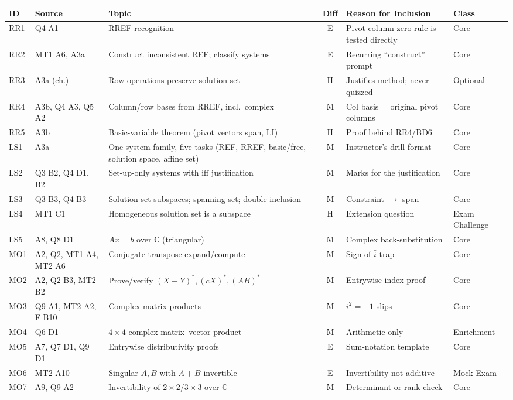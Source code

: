 \documentclass[9pt]{article}
\begin{document}
{\footnotesize\begin{longtable}{@{}l p{2.6cm} p{5.2cm} c p{3.9cm} p{1.7cm}@{}}\toprule \textbf{ID}&\textbf{Source}&\textbf{Topic}&\textbf{Diff}&\textbf{Reason for Inclusion}&\textbf{Class}\\\midrule\endhead
RR1 & Q4 A1 & RREF recognition & E & Pivot-column zero rule is tested directly & Core\\
RR2 & MT1 A6, A3a & Construct inconsistent REF; classify systems & E & Recurring ``construct'' prompt & Core\\
RR3 & A3a (ch.) & Row operations preserve solution set & H & Justifies method; never quizzed & Optional\\
RR4 & A3b, Q4 A3, Q5 A2 & Column/row bases from RREF, incl.\ complex & M & Col basis = original pivot columns & Core\\
RR5 & A3b & Basic-variable theorem (pivot vectors span, LI) & H & Proof behind RR4/BD6 & Core\\
LS1 & A3a & One system family, five tasks (REF, RREF, basic/free, solution space, affine set) & M & Instructor's drill format & Core\\
LS2 & Q3 B2, Q4 D1, B2 & Set-up-only systems with iff justification & M & Marks for the justification & Core\\
LS3 & Q3 B3, Q4 B3 & Solution-set subspaces; spanning set; double inclusion & M & Constraint $\to$ span & Core\\
LS4 & MT1 C1 & Homogeneous solution set is a subspace & H & Extension question & Exam Challenge\\
LS5 & A8, Q8 D1 & $Ax=b$ over $\mathbb C$ (triangular) & M & Complex back-substitution & Core\\
MO1 & A2, Q2, MT1 A4, MT2 A6 & Conjugate-transpose expand/compute & M & Sign of $\bar i$ trap & Core\\
MO2 & A2, Q2 B3, MT2 B2 & Prove/verify $(X{+}Y)^*,(cX)^*,(AB)^*$ & M & Entrywise index proof & Core\\
MO3 & Q9 A1, MT2 A2, F B10 & Complex matrix products & M & $i^2=-1$ slips & Core\\
MO4 & Q6 D1 & $4\times4$ complex matrix--vector product & M & Arithmetic only & Enrichment\\
MO5 & A7, Q7 D1, Q9 D1 & Entrywise distributivity proofs & E & Sum-notation template & Core\\
MO6 & MT2 A10 & Singular $A,B$ with $A+B$ invertible & E & Invertibility not additive & Mock Exam\\
MO7 & A9, Q9 A2 & Invertibility of $2\times2$/$3\times3$ over $\mathbb C$ & M & Determinant or rank check & Core\\

\end{longtable}}
\end{document}
